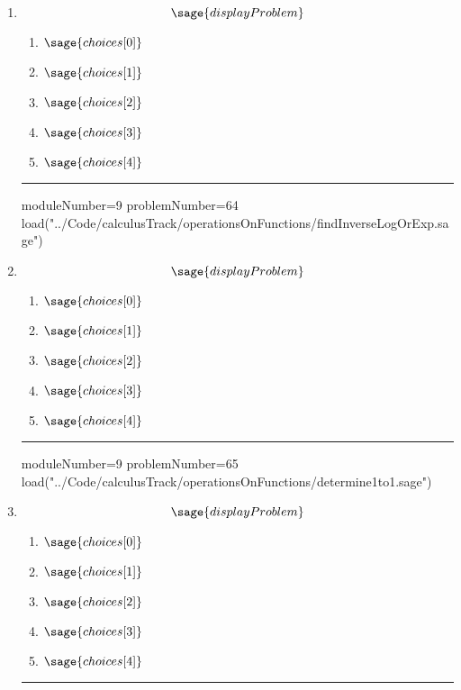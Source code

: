 \documentclass[14pt]{article}
\newcommand{\litem}[1]{\item#1\hspace*{-1cm}\rule{\textwidth}{0.4pt}}
\begin{document}
\begin{enumerate}
\litem{ 

 \[ \sage{displayProblem} \]

	\begin{enumerate}[label=\Alph*.]
  \item \( \sage{choices[0]} \)
  \item \( \sage{choices[1]} \)
  \item \( \sage{choices[2]} \)
  \item \( \sage{choices[3]} \)
  \item \( \sage{choices[4]} \)
	\end{enumerate}
}

\begin{sagesilent}
moduleNumber=9
problemNumber=64
load("../Code/calculusTrack/operationsOnFunctions/findInverseLogOrExp.sage")
\end{sagesilent}

\litem{ 

 \[ \sage{displayProblem} \]

	\begin{enumerate}[label=\Alph*.]
  \item \( \sage{choices[0]} \)
  \item \( \sage{choices[1]} \)
  \item \( \sage{choices[2]} \)
  \item \( \sage{choices[3]} \)
  \item \( \sage{choices[4]} \)
	\end{enumerate}
}

\begin{sagesilent}
moduleNumber=9
problemNumber=65
load("../Code/calculusTrack/operationsOnFunctions/determine1to1.sage")
\end{sagesilent}

\litem{ 

 \[ \sage{displayProblem} \]

	\begin{enumerate}[label=\Alph*.]
  \item \( \sage{choices[0]} \)
  \item \( \sage{choices[1]} \)
  \item \( \sage{choices[2]} \)
  \item \( \sage{choices[3]} \)
  \item \( \sage{choices[4]} \)
	\end{enumerate}
}

\end{enumerate}
\end{document}
